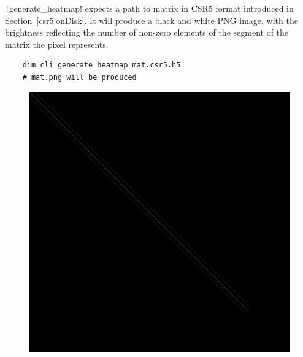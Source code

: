 \documentclass[thesis=M,english]{FITthesis}[2019/12/23]
\newcommand{\csre}[1]{\texttt!#1!}
\begin{document}
\csre{generate_heatmap} expects a path to matrix in CSR5 format introduced in Section~\ref{csr5:onDisk}.
It will produce a black and white PNG image, with the brightness reflecting the number of non-zero elements
of the segment of the matrix the pixel represents.

\begin{verbatim}
    dim_cli generate_heatmap mat.csr5.h5
    # mat.png will be produced
\end{verbatim}

\begin{figure}[htp]
    \begin{minipage}{0.5\textwidth}
        \includegraphics[trim=0 2500 2500 0, clip, scale=0.1]{static/e40r5000.png}
    \end{minipage}
    \begin{minipage}{0.5\textwidth}

\end{minipage}
\end{figure}
\end{document}
